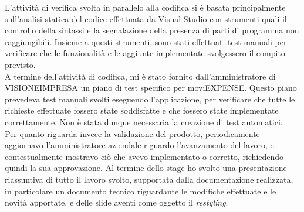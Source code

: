 L'attività di verifica svolta in parallelo alla codifica si è basata principalmente sull'analisi statica del codice effettuata da Visual Studio con strumenti quali il controllo della sintassi e la segnalazione della presenza di parti di programma non raggiungibili. Insieme a questi strumenti, sono stati effettuati test manuali per verificare che le funzionalità e le aggiunte implementate svolgessero il compito previsto.\\
A termine dell'attività di codifica, mi è stato fornito dall'amministratore di VISIONEIMPRESA un piano di test specifico per moviEXPENSE. Questo piano prevedeva test manuali svolti eseguendo l'applicazione, per verificare che tutte le richieste effettuate fossero state soddisfatte e che fossero state implementate correttamente. Non è stata dunque necessaria la creazione di test automatici.\\
Per quanto riguarda invece la validazione del prodotto, periodicamente aggiornavo l'amministratore aziendale riguardo l'avanzamento del lavoro, e contestualmente mostravo ciò che avevo implementato o corretto, richiedendo quindi la sua approvazione. Al termine dello stage ho svolto una presentazione riassuntiva di tutto il lavoro svolto, supportata dalla documentazione realizzata, in particolare un documento tecnico riguardante le modifiche effettuate e le novità apportate, e delle slide aventi come oggetto il \emph{restyling}.
